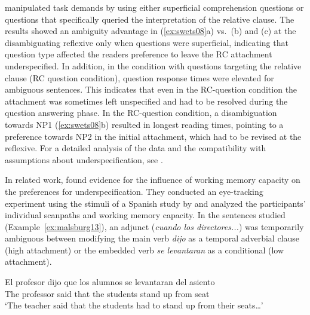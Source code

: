 \documentclass{cambridge7A}\usepackage[]{graphicx}\usepackage[]{color}
\begin{document}
\cite{SwetsDesmetClifton2008} manipulated task demands by using either superficial comprehension questions or questions that specifically queried the interpretation of the relative clause. The results showed an ambiguity advantage in (\ref{ex:swets08}a) vs.\ (b) and (c) at the disambiguating reflexive only when questions were superficial, indicating that question type affected the readers preference to leave the RC attachment underspecified. 
In addition, in the condition with questions targeting the relative clause (RC question condition), question response times were elevated for ambiguous sentences. This indicates that even in the RC-question condition the attachment was sometimes left unspecified and had to be resolved during the question answering phase. In the RC-question condition, a disambiguation towards NP1 (\ref{ex:swets08}b) resulted in longest reading times, pointing to a preference towards NP2 in the initial attachment, which had to be revised at the reflexive. For a detailed analysis of the \cite{SwetsDesmetClifton2008} data and the compatibility with assumptions about underspecification, see \cite{LogacevMultiple,LogacevVasishthQJEP2016}.

In related work, \cite{MalsburgVasishth2013} found evidence for the influence of working memory capacity on the preferences for underspecification.
They conducted an eye-tracking experiment using the stimuli of a Spanish study by \cite{MeseguerCarreirasClifton2002} and analyzed the participants' individual scanpaths \citep{MalsburgVasishth2011} and working memory capacity. 
In the sentences studied (Example~\ref{ex:malsburg13}), an adjunct (\textit{cuando los directores...}) was temporarily ambiguous between modifying the main verb \textit{dijo} as a temporal adverbial clause (high attachment) or the embedded verb \textit{se levantaran} as a conditional (low attachment). 

\begin{exe}
\ex\label{ex:malsburg13preamble} 
\gll El profesor dijo que los alumnos {se levantaran} del asiento\\
     The professor said that the students {stand up} from seat \\
\glt `The teacher said that the students had to stand up from their seats\dots'
\end{exe}
\end{document}
